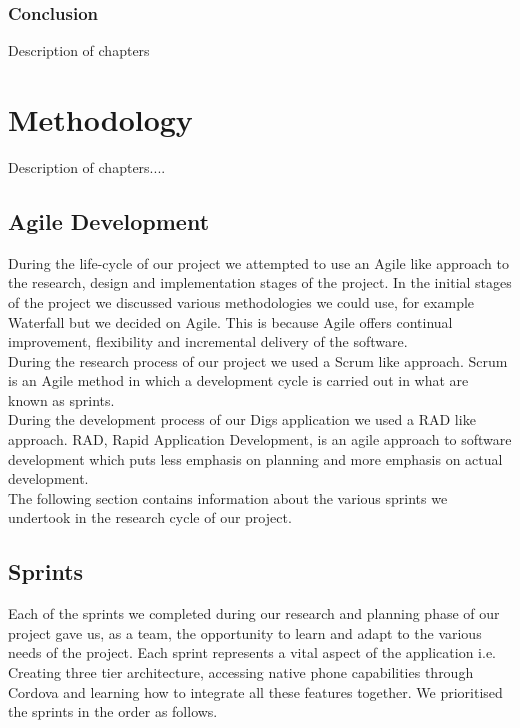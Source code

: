 \subsection{Conclusion}
Description of chapters


\chapter{Methodology}
Description of chapters....

\section{Agile Development}
During the life-cycle of our project we attempted to use an Agile like approach to the research, design and implementation stages of the project. In the initial stages of the project we discussed various methodologies we could use, for example Waterfall but we decided on Agile. This is because Agile offers continual improvement, flexibility and incremental delivery of the software. \\

\noindent During the research process of our project we used a Scrum like approach. Scrum is an Agile method in which a development cycle is carried out in what are known as sprints. \\

\noindent During the development process of our Digs application we used a RAD like approach. RAD, Rapid Application Development, is an agile approach to software development which puts less emphasis on planning and more emphasis on actual development. \\

\noindent The following section contains information about the various sprints we undertook in the research cycle of our project.

\section{Sprints}
Each of the sprints we completed during our research and planning phase of our project gave us, as a team, the opportunity to learn and adapt to the various needs of the project. Each sprint represents a vital aspect of the application i.e. Creating three tier architecture, accessing native phone capabilities through Cordova and learning how to integrate all these features together. We prioritised the sprints in the order as follows.

